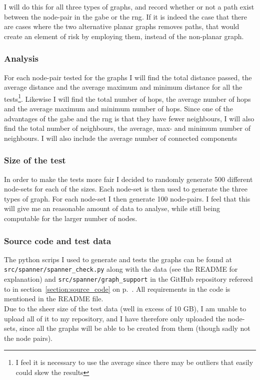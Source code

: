I will do this for all three types of graphs, and record whether or not a path exist between the node-pair in the \ac{gabe} or the \ac{rng}. If it is indeed the case that there are cases where the two alternative planar graphs removes paths, that would create an element of risk by employing them, instead of the non-planar graph.

\subsubsection{Analysis}

For each node-pair tested for the graphs I will find the total distance passed, the average distance and the average maximum and minimum distance for all the tests\footnote{I feel it is necessary to use the average since there may be outliers that easily could skew the results}. Likewise I will find the total number of hops, the average number of hops and the average maximum and minimum number of hops. Since one of the advantages of the \ac{gabe} and the \ac{rng} is that they have fewer neighbours, I will also find the total number of neighbours, the average, max- and minimum number of neighbours. I will also include the average number of connected components 


\subsubsection{Size of the test}
In order to make the tests more fair I decided to randomly generate 500 different node-sets for each of the sizes. Each node-set is then used to generate the three types of graph. For each node-set I then generate 100 node-pairs. I feel that this will give me an reasonable amount of data to analyse, while still being computable for the larger number of nodes.


\subsubsection{Source code and test data}
The python scrips I used to generate and tests the graphs can be found at \texttt{src/spanner/spanner\_check.py} along with the data (see the README for explanation) and \texttt{src/spanner/graph\_support} in the GitHub repository refereed to in section~\ref{section:source_code} on p.~\pageref{section:source_code}. All requirements in the code is mentioned in the README file.\\

Due to the sheer size of the test data (well in excess of 10 GB), I am unable to upload all of it to my repository, and I have therefore only uploaded the node-sets, since all the graphs will be able to be created from them (though sadly not the node pairs).
